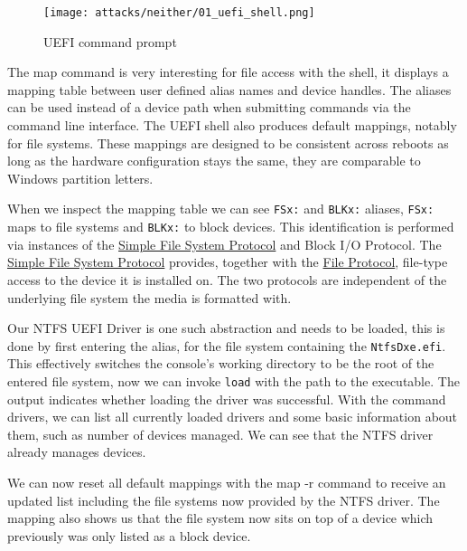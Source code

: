 \begin{figure}[htb]
    \centering
    \texttt{[image: attacks/neither/01\_uefi\_shell.png]}
    \caption{\ac{UEFI} command prompt}
    \label{fig:uefi-shell}
\end{figure}


The map command is very interesting for file access with the shell, it displays a mapping table between user defined alias names and device handles.
The aliases can be used instead of a device path when submitting commands via the command line interface.
The \ac{UEFI} shell also produces default mappings, notably for file systems\cite[3.7.2. Mappings]{uefi-shell-spec}.
These mappings are designed to be consistent across reboots as long as the hardware configuration stays the same, they are comparable to Windows partition letters\cite[Appendix A]{uefi-shell-spec}.

When we inspect the mapping table we can see \lstinline{FSx:} and \lstinline{BLKx:} aliases, \lstinline{FSx:} maps to file systems and \lstinline{BLKx:} to block devices.
This identification is performed via instances of the \hyperref[lst:simple-file-system-protocol]{Simple File System Protocol} and  Block \ac{I/O} Protocol.
The \hyperref[lst:simple-file-system-protocol]{Simple File System Protocol}\cite[13.4]{uefi-spec} provides, together with the \hyperref[lst:simple-file-system-protocol]{File Protocol}, file-type access to the device it is installed on\cite[13.5]{uefi-spec}.
The two protocols are independent of the underlying file system the media is formatted with.


Our \ac{NTFS} \ac{UEFI} Driver is one such abstraction and needs to be loaded, this is done by first entering the alias, for the file system containing the \lstinline{NtfsDxe.efi}.
This effectively switches the console's working directory to be the root of the entered file system, now we can invoke \lstinline{load} with the path to the executable.
The output indicates whether loading the driver was successful.
With the command drivers, we can list all currently loaded drivers and some basic information about them, such as number of devices managed.
We can see that the NTFS driver already manages devices.

We can now reset all default mappings with the map -r command to receive an updated list including the file systems now provided by the \ac{NTFS} driver.
The mapping also shows us that the file system now sits on top of a device which previously was only listed as a block device.

